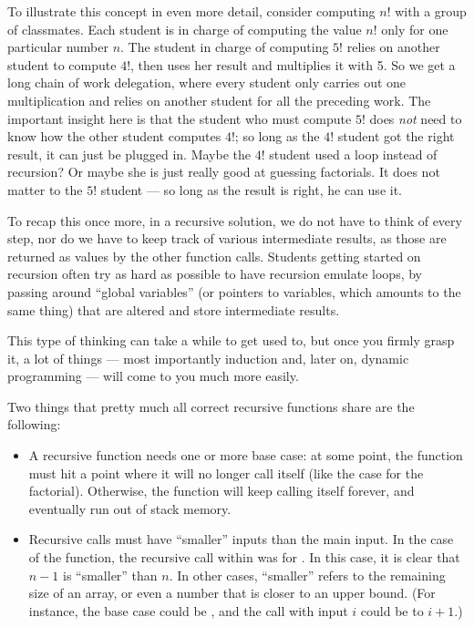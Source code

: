 To illustrate this concept in even more detail, consider computing
$n!$ with a group of classmates.
Each student is in charge of computing the value $n!$ only for one
particular number $n$.
The student in charge of computing $5!$ relies on another student to
compute $4!$, then uses her result and multiplies it with 5.
So we get a long chain of work delegation,
where every student only carries out one multiplication
and relies on another student for all the preceding work.
The important insight here is that the student who must compute
$5!$ does \emph{not} need to know how the other student computes $4!$;
so long as the $4!$ student got the right result,
it can just be plugged in.
Maybe the $4!$ student used a loop instead of recursion?
Or maybe she is just really good at guessing factorials.
It does not matter to the $5!$ student --- so long as the result is
right, he can use it.

To recap this once more, in a recursive solution,
we do not have to think of every step,
nor do we have to keep track of various intermediate results,
as those are returned as values by the other function calls. 
Students getting started on recursion often try as hard as possible to
have recursion emulate loops, by passing around ``global variables''
(or pointers to variables, which amounts to the same thing)
that are altered and store intermediate results.

This type of thinking can take a while to get used to,
but once you firmly grasp it, a lot of things
--- most importantly induction and, later on, dynamic programming ---
will come to you much more easily.

Two things that pretty much all correct recursive functions share are
the following:

\begin{itemize}
\item A recursive function needs one or more base case: at some point,
  the function must hit a point where it will no longer call itself
  (like the  case for the factorial). 
  Otherwise, the function will keep calling itself forever, and
  eventually run out of stack memory.
\item Recursive calls must have ``smaller'' inputs than the main
  input. In the case of the  function, the recursive
  call within  was for .
  In this case, it is clear that $n-1$ is ``smaller'' than $n$.
  In other cases, ``smaller'' refers to the remaining size of an
  array, or even a number that is closer to an upper bound.
  (For instance, the base case could be , and the call with
  input $i$ could be to $i+1$.)
\end{itemize}

